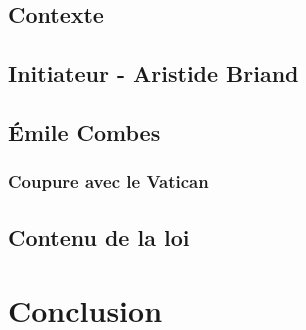 \documentclass{article}
\begin{document}
\subsection{Contexte}
\subsection{Initiateur - Aristide Briand}
\subsection{\'Emile Combes}
\subsubsection{Coupure avec le Vatican}
\subsection{Contenu de la loi}


\section{Conclusion}
\end{document}
